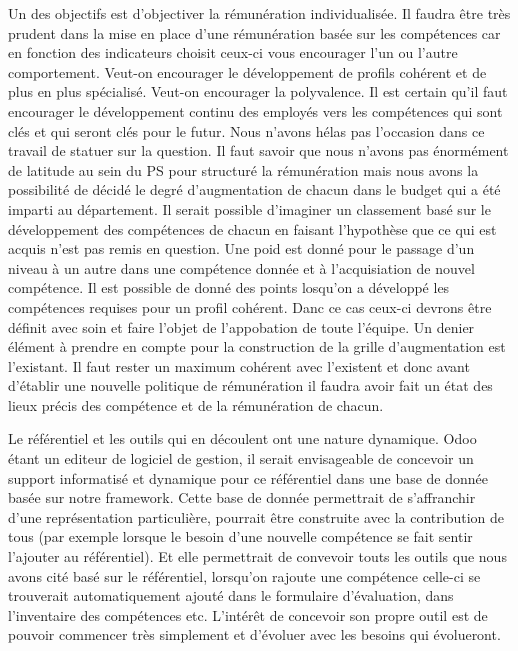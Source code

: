 \begin{description}
    Un des objectifs est d'objectiver la rémunération individualisée. Il faudra être très prudent dans la mise en place d'une rémunération basée sur les compétences car en fonction des indicateurs choisit ceux-ci vous encourager l'un ou l'autre comportement. Veut-on encourager le développement de profils cohérent et de plus en plus spécialisé. Veut-on encourager la polyvalence. Il est certain qu'il faut encourager le développement continu des employés vers les compétences qui sont clés et qui seront clés pour le futur. Nous n'avons hélas pas l'occasion dans ce travail de statuer sur la question. Il faut savoir que nous n'avons pas énormément de latitude au sein du PS pour structuré la rémunération mais nous avons la possibilité de décidé le degré d'augmentation de chacun dans le budget qui a été imparti au département. Il serait possible d'imaginer un classement basé sur le développement des compétences de chacun en faisant l'hypothèse que ce qui est acquis n'est pas remis en question. Une poid est donné pour le passage d'un niveau à un autre dans une compétence donnée et à l'acquisiation de nouvel compétence. Il est possible de donné des points losqu'on a développé les compétences requises pour un profil cohérent. Danc ce cas ceux-ci devrons être définit avec soin et faire l'objet de l'appobation de toute l'équipe. Un denier élément à prendre en compte pour la construction de la grille d'augmentation est l'existant. Il faut rester un maximum cohérent avec l'existent et donc avant d'établir une nouvelle politique de rémunération il faudra avoir fait un état des lieux précis des compétence et de la rémunération de chacun.
    
    \end{description}
    
    Le référentiel et les outils qui en découlent ont une nature dynamique. Odoo étant un editeur de logiciel de gestion, il serait envisageable de concevoir un support informatisé et dynamique pour ce référentiel dans une base de donnée basée sur notre framework. Cette base de donnée permettrait de s'affranchir d'une représentation particulière, pourrait être construite avec la contribution de tous (par exemple lorsque le besoin d'une nouvelle compétence se fait sentir l'ajouter au référentiel). Et elle permettrait de convevoir touts les outils que nous avons cité basé sur le référentiel, lorsqu'on rajoute une compétence celle-ci se trouverait automatiquement ajouté dans le formulaire d'évaluation, dans l'inventaire des compétences etc. L'intérêt de concevoir son propre outil est de pouvoir commencer très simplement et d'évoluer avec les besoins qui évolueront. 



